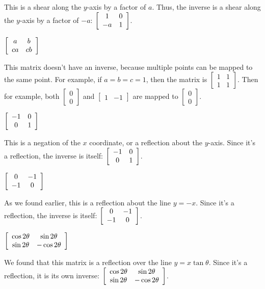 \documentclass[../key.tex]{subfiles}
\begin{document}
This is a shear along the $y$-axis by a factor of $a$. Thus, the inverse is a shear along the $y$-axis by a factor of $-a$: $\left[\begin{array}{cc} 1 & 0 \\ -a & 1 \end{array}\right]$.

\begin{inner_problem}
\item $\left[\begin{array}{cc} a & b \\ ca & cb \end{array}\right]$
\end{inner_problem}

This matrix doesn't have an inverse, because multiple points can be mapped to the same point. For example, if $a=b=c=1$, then the matrix is $\begin{bmatrix} 1 & 1 \\ 1 & 1 \end{bmatrix}$. Then for example, both $\begin{bmatrix} 0 \\ 0 \end{bmatrix}$ and $\begin{bmatrix} 1 & -1 \end{bmatrix}$ are mapped to $\begin{bmatrix} 0 \\ 0 \end{bmatrix}$.

\begin{inner_problem}
\item $\left[\begin{array}{cc} -1 & 0 \\ 0 & 1 \end{array}\right]$ \label{prob:highlighted_example_list_transformations1}
\end{inner_problem}

This is a negation of the $x$ coordinate, or a reflection about the $y$-axis. Since it's a reflection, the inverse is itself: $\left[\begin{array}{cc} -1 & 0 \\ 0 & 1 \end{array}\right]$.

\begin{inner_problem}
\item $\left[\begin{array}{cc} 0 & -1 \\ -1 & 0 \end{array}\right]$ \label{prob:highlighted_example_list_transformations2}
\end{inner_problem}

As we found earlier, this is a reflection about the line $y=-x$. Since it's a reflection, the inverse is itself: $\left[\begin{array}{cc} 0 & -1 \\ -1 & 0 \end{array}\right]$.

\begin{inner_problem}
\item $\left[\begin{array}{cc} \cos 2\theta & \sin 2\theta \\ \sin 2\theta & -\cos 2\theta \end{array}\right]$ \label{prob:list_transformations_part_end}
\end{inner_problem}

We found that this matrix is a reflection over the line $y=x\tan\theta$. Since it's a reflection, it is its own inverse: $\left[\begin{array}{cc} \cos 2\theta & \sin 2\theta \\ \sin 2\theta & -\cos 2\theta \end{array}\right]$.
\end{document}
